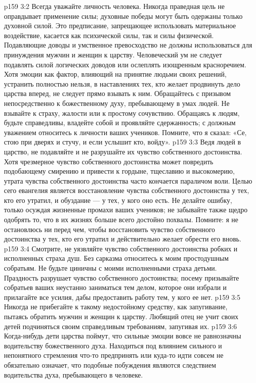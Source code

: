 \vs p159 3:2 \pc Всегда уважайте личность человека. Никогда праведная цель не оправдывает применение силы; духовные победы могут быть одержаны только духовной силой. Это предписание, запрещающее использовать материальное воздействие, касается как психической силы, так и силы физической. Подавляющие доводы и умственное превосходство не должны использоваться для принуждения мужчин и женщин к царству. Человеческий ум не следует подавлять силой логических доводов или ослеплять изощренным красноречием. Хотя эмоции как фактор, влияющий на принятие людьми своих решений, устранить полностью нельзя, в наставлениях тех, кто желает продвинуть дело царства вперед, не следует прямо взывать к ним. Обращайтесь с призывом непосредственно к божественному духу, пребывающему в умах людей. Не взывайте к страху, жалости или к простому сочувствию. Обращаясь к людям, будьте справедливы, владейте собой и проявляйте сдержанность; с должным уважением относитесь к личности ваших учеников. Помните, что я сказал: «Се, стою при дверях и стучу, и если услышит кто, войду».
\vs p159 3:3 Ведя людей в царство, не подавляйте и не разрушайте их чувство собственного достоинства. Хотя чрезмерное чувство собственного достоинства может повредить подобающему смирению и привести к гордыне, тщеславию и высокомерию, утрата чувства собственного достоинства часто кончается параличом воли. Целью сего евангелия является восстановление чувства собственного достоинства у тех, кто его утратил, и обуздание --- у тех, у кого оно есть. Не делайте ошибку, только осуждая жизненные промахи ваших учеников; не забывайте также щедро одобрять то, что в их жизнях больше всего достойно похвалы. Помните: я не остановлюсь ни перед чем, чтобы восстановить чувство собственного достоинства у тех, кто его утратил и действительно желает обрести его вновь.
\vs p159 3:4 Смотрите, не уязвляйте чувство собственного достоинства робких и исполненных страха душ. Без сарказма относитесь к моим простодушным собратьям. Не будьте циничны с моими исполненными страха детьми. Праздность разрушает чувство собственного достоинства; посему призывайте собратьев ваших неустанно заниматься тем делом, которое они избрали и прилагайте все усилия, дабы предоставить работу тем, у кого ее нет.
\vs p159 3:5 Никогда не прибегайте к такому недостойному средству, как запугивание, пытаясь обратить мужчин и женщин к царству. Любящий отец не учит своих детей подчиняться своим справедливым требованиям, запугивая их.
\vs p159 3:6 Когда\hyp{}нибудь дети царства поймут, что сильные эмоции вовсе не равнозначны водительству божественного духа. Находиться под влиянием сильного и непонятного стремления что\hyp{}то предпринять или куда\hyp{}то идти совсем не обязательно означает, что подобные побуждения являются следствием водительства духа, пребывающего в человеке.
